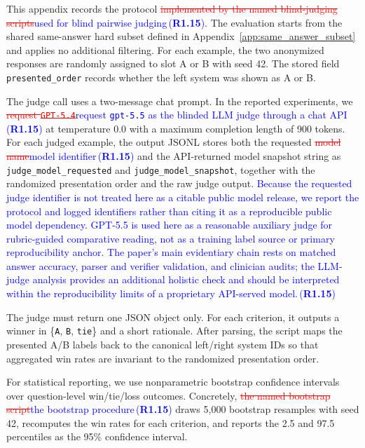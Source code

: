 \documentclass[a4paper,fleqn,doubleblind]{cas-sc}
\DeclareRobustCommand{\deleted}[1]{\textcolor{red}{\sout{#1}}}
\DeclareRobustCommand{\added}[1]{\textcolor{blue}{#1}}
\DeclareRobustCommand{\revtag}[1]{\textcolor{blue}{\scriptsize\,(\textbf{#1})}}
\begin{document}
This appendix records the protocol \deleted{implemented by the named blind-judging scripts}\added{used for blind pairwise judging}\revtag{R1.15}. The evaluation starts from the shared same-answer hard subset defined in Appendix~\ref{app:same_answer_subset} and applies no additional filtering. For each example, the two anonymized responses are randomly assigned to slot A or B with seed 42. The stored field \texttt{presented\_order} records whether the left system was shown as A or B.

The judge call uses a two-message chat prompt. In the reported experiments, we \deleted{request \texttt{GPT-5.4}}\added{request \texttt{gpt-5.5} as the blinded LLM judge through a chat API}\revtag{R1.15} at temperature 0.0 with a maximum completion length of 900 tokens. For each judged example, the output JSONL stores both the requested \deleted{model name}\added{model identifier}\revtag{R1.15} and the API-returned model snapshot string as \texttt{judge\_model\_requested} and \texttt{judge\_model\_snapshot}, together with the randomized presentation order and the raw judge output. \added{Because the requested judge identifier is not treated here as a citable public model release, we report the protocol and logged identifiers rather than citing it as a reproducible public model dependency. GPT-5.5 is used here as a reasonable auxiliary judge for rubric-guided comparative reading, not as a training label source or primary reproducibility anchor. The paper's main evidentiary chain rests on matched answer accuracy, parser and verifier validation, and clinician audits; the LLM-judge analysis provides an additional holistic check and should be interpreted within the reproducibility limits of a proprietary API-served model.}\revtag{R1.15}

The judge must return one JSON object only. For each criterion, it outputs a winner in \{\texttt{A}, \texttt{B}, \texttt{tie}\} and a short rationale. After parsing, the script maps the presented A/B labels back to the canonical left/right system IDs so that aggregated win rates are invariant to the randomized presentation order.

For statistical reporting, we use nonparametric bootstrap confidence intervals over question-level win/tie/loss outcomes. Concretely, \deleted{the named bootstrap script}\added{the bootstrap procedure}\revtag{R1.15} draws 5,000 bootstrap resamples with seed 42, recomputes the win rates for each criterion, and reports the 2.5 and 97.5 percentiles as the 95\% confidence interval.
\end{document}
